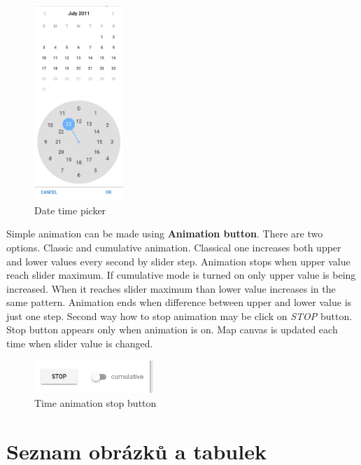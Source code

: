\begin{figure}[h!]
	\centering
	\includegraphics[width=0.3\textwidth]{../img/date-time-picker.png}
	\caption{Date time picker}
	\label{fig:date-time-picker}
\end{figure}

Simple animation can be made using \textbf{Animation button}. There are two 
options. Classic and cumulative animation. Classical one increases both 
upper and lower values every second by slider step. 
Animation stops when upper value reach slider maximum. If cumulative 
mode is turned on only upper value is being increased. When it reaches 
slider maximum than lower value increases in the same pattern.
Animation ends when difference between upper and lower value is just one 
step. Second  way how to stop animation may be click on \textit{STOP} button. 
Stop button appears only when animation is on. Map canvas is updated 
each time when slider value is changed.

\begin{figure}[h!]
	\centering
	\includegraphics[width=0.4\textwidth]{../img/time-animation-stop.png}
	\caption{Time animation stop button}
	\label{fig:time-animation-stop}
\end{figure}

\newpage
\section{Seznam obrázků a tabulek}
\listoffigures
\listoftables


